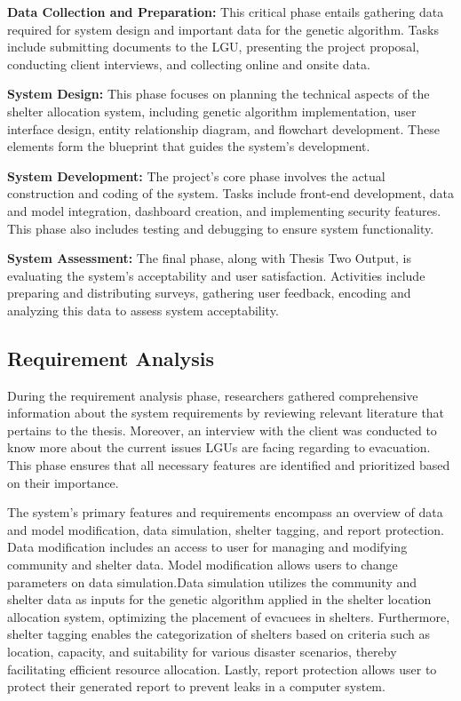 	\textbf{Data Collection and Preparation:} This critical phase entails gathering data required for system design and important data for the genetic algorithm. Tasks include submitting documents to the LGU, presenting the project proposal, conducting client interviews, and collecting online and onsite data.
	
	\textbf{System Design:} This phase focuses on planning the technical aspects of the shelter allocation system, including genetic algorithm implementation, user interface design, entity relationship diagram, and flowchart development. These elements form the blueprint that guides the system's development.
	
	\textbf{System Development:} The project's core phase involves the actual construction and coding of the system. Tasks include front-end development, data and model integration, dashboard creation, and implementing security features. This phase also includes testing and debugging to ensure system functionality.
	
	\textbf{System Assessment:} The final phase, along with Thesis Two Output, is evaluating the system's acceptability and user satisfaction. Activities include preparing and distributing surveys, gathering user feedback, encoding and analyzing this data to assess system acceptability.

\subsection{Requirement Analysis}
	During the requirement analysis phase, researchers gathered comprehensive information about the system requirements by reviewing relevant literature that pertains to the thesis. Moreover, an interview with the client was conducted to know more about the current issues LGUs are facing regarding to evacuation. This phase ensures that all necessary features are identified and prioritized based on their importance.
	
	The system's primary features and requirements encompass an overview of data and model modification, data simulation, shelter tagging, and report protection. Data modification includes an access to user for managing and modifying community and shelter data. Model modification allows users to change parameters on data simulation.Data simulation utilizes the community and shelter data as inputs for the genetic algorithm applied in the shelter location allocation system, optimizing the placement of evacuees in shelters. Furthermore, shelter tagging enables the categorization of shelters based on criteria such as location, capacity, and suitability for various disaster scenarios, thereby facilitating efficient resource allocation. Lastly, report protection allows user to protect their generated report to prevent leaks in a computer system.
	
